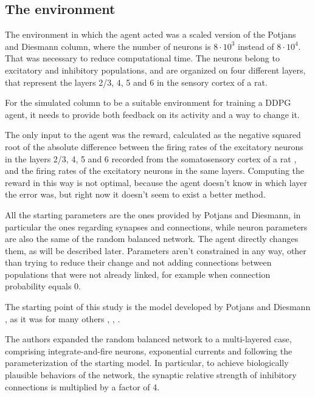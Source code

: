 \subsection{The environment}

The environment in which the agent acted was a scaled version of the Potjans and Diesmann column, where the number of neurons is $8 \cdot 10^3$ instead of $8 \cdot 10^4$. That was necessary to reduce computational time. The neurons belong to excitatory and inhibitory populations, and are organized on four different layers, that represent the layers 2/3, 4, 5 and 6 in the sensory cortex of a rat.

For the simulated column to be a suitable environment for training a DDPG agent, it needs to provide both feedback on its activity and a way to change it.

The only input to the agent was the reward, calculated as the negative squared root of the absolute difference between the firing rates of the excitatory neurons in the layers 2/3, 4, 5 and 6 recorded from the somatosensory cortex of a rat \cite{kock}, and the firing rates of the excitatory neurons in the same layers. Computing the reward in this way is not optimal, because the agent doesn't know in which layer the error was, but right now it doesn't seem to exist a better method.  

All the starting parameters are the ones provided by Potjans and Diesmann, in particular the ones regarding synapses and connections, while neuron parameters are also the same of the random balanced network. The agent directly changes them, as will be described later. Parameters aren't constrained in any way, other than trying to reduce their change and not adding connections between populations that were not already linked, for example when connection probability equals 0.

The starting point of this study is the model developed by Potjans and Diesmann \cite{potjans}, as it was for many others \cite{wagatsuma2011layer}, \cite{linden2011modeling}, \cite{shimoura2018reimplementation}. 

The authors \cite{potjans} expanded the random balanced network \cite{brunel} to a multi-layered case, comprising integrate-and-fire neurons, exponential currents and following the parameterization of the starting model. In particular, to achieve biologically plausible behaviors of the network, the synaptic relative strength of inhibitory connections is multiplied by a factor of 4.

